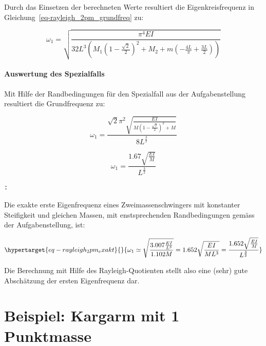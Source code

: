 \documentclass[
  letterpaper,
  DIV=11]{scrreprt}
\begin{document}
Durch das Einsetzen der berechneten Werte resultiert die
Eigenkreisfrequenz in Gleichung~\ref{eq-rayleigh_2pm_grundfreq} zu:

\begin{equation}\omega_{1} = \sqrt{\frac{\pi^{4} E I}{32 L^{3} \left(M_{1} \left(1 - \frac{\sqrt{2}}{2}\right)^{2} + M_{2} + m \left(- \frac{4 L}{\pi} + \frac{3 L}{2}\right)\right)}}\end{equation}

\hypertarget{auswertung-des-spezialfalls}{%
\subsubsection{Auswertung des
Spezialfalls}\label{auswertung-des-spezialfalls}}

Mit Hilfe der Randbedingungen für den Spezialfall aus der
Aufgabenstellung resultiert die Grundfrequenz zu:

\begin{equation}\omega_{1} = \frac{\sqrt{2} \pi^{2} \sqrt{\frac{E I}{M \left(1 - \frac{\sqrt{2}}{2}\right)^{2} + M}}}{8 L^{\frac{3}{2}}}\end{equation}

\begin{equation}\omega_{1} = \frac{1.67 \sqrt{\frac{E I}{M}}}{L^{\frac{3}{2}}}\end{equation}

\begin{verbatim}
: 
\end{verbatim}

Die exakte erste Eigenfrequenz eines Zweimassenschwingers mit konstanter
Steifigkeit und gleichen Massen, mit enstsprechenden Randbedingungen
gemäss der Aufgabenstellung, ist:

\begin{equation}\protect\hypertarget{eq-rayleigh_2pm_exakt}{}{
\omega_1 \simeq \sqrt{\frac{3.007\frac{EI}{L^3}}{1.102 M}} = 1.652 \sqrt{\frac{EI}{ML^3}} = \frac{1.652 \sqrt{\frac{E I}{M}}}{L^{\frac{3}{2}}}
}\label{eq-rayleigh_2pm_exakt}\end{equation}

Die Berechnung mit Hilfe des Rayleigh-Quotienten stellt also eine (sehr)
gute Abschätzung der ersten Eigenfrequenz dar.

\hypertarget{beispiel-kargarm-mit-1-punktmasse}{%
\chapter{Beispiel: Kargarm mit 1
Punktmasse}\label{beispiel-kargarm-mit-1-punktmasse}}
\end{document}
